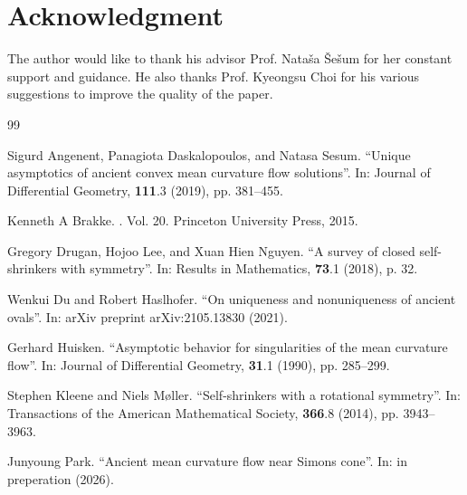 \documentclass[pdflatex,sn-mathphys-num]{sn-jnl}
\begin{document}
\section*{Acknowledgment}
The author would like to thank his advisor Prof. Nata\v sa \v Se\v sum for her constant support and guidance. He also thanks Prof. Kyeongsu Choi for his various suggestions to improve the quality of the paper.
\begin{thebibliography}{99}

 Sigurd Angenent, Panagiota Daskalopoulos, and Natasa Sesum.
\newblock ``Unique asymptotics of ancient convex mean curvature flow solutions''.
\newblock In: Journal of Differential Geometry, \textbf{111}.3 (2019), pp. 381--455.

 Kenneth A Brakke.
.
\newblock Vol. 20. Princeton University Press, 2015.

 Gregory Drugan, Hojoo Lee, and Xuan Hien Nguyen.
\newblock ``A survey of closed self-shrinkers with symmetry''.
\newblock In: Results in Mathematics, \textbf{73}.1 (2018), p. 32.

 Wenkui Du and Robert Haslhofer.
\newblock ``On uniqueness and nonuniqueness of ancient ovals''.
\newblock In: arXiv preprint arXiv:2105.13830 (2021).

 Gerhard Huisken.
\newblock ``Asymptotic behavior for singularities of the mean curvature flow''.
\newblock In: Journal of Differential Geometry, \textbf{31}.1 (1990), pp. 285--299.

 Stephen Kleene and Niels M\o ller.
\newblock ``Self-shrinkers with a rotational symmetry''.
\newblock In: Transactions of the American Mathematical Society, \textbf{366}.8 (2014), pp. 3943--3963.

 Junyoung Park.
\newblock ``Ancient mean curvature flow near Simons cone''.
\newblock In: in preperation (2026).

\end{thebibliography}
\end{document}
